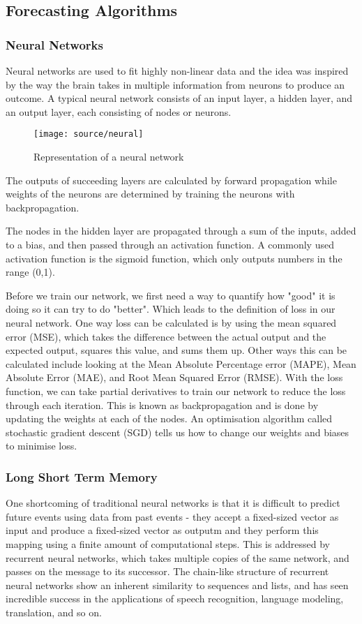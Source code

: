 \documentclass[12pt,twocolumn]{article}
\begin{document}
		\subsection{Forecasting Algorithms}

			\subsubsection*{Neural Networks}
				\quad Neural networks are used to fit highly non-linear data and the idea was inspired by the way the brain takes in multiple information from neurons to produce an outcome. A typical neural network consists of an input layer, a hidden layer, and an output layer, each consisting of nodes or neurons. 

				\begin{figure}[!htbp]
					\centering
					\texttt{[image: source/neural]}
					\caption{Representation of a neural network}
				\end{figure}

				The outputs of succeeding layers are calculated by forward propagation while weights of the neurons are determined by training the neurons with backpropagation. 

				The nodes in the hidden layer are propagated through a sum of the inputs, added to a bias, and then passed through an activation function. A commonly used activation function is the sigmoid function, which only outputs numbers in the range (0,1). 

				\quad Before we train our network, we first need a way to quantify how "good" it is doing so it can try to do "better". Which leads to the definition of loss in our neural network. One way loss can be calculated is by using the mean squared error (MSE), which takes the difference between the actual output and the expected output, squares this value, and sums them up. Other ways this can be calculated include looking at the Mean Absolute Percentage error (MAPE), Mean Absolute Error (MAE), and Root Mean Squared Error (RMSE). With the loss function, we can take partial derivatives to train our network to reduce the loss through each iteration. This is known as backpropagation and is done by updating the weights at each of the nodes. An optimisation algorithm called stochastic gradient descent (SGD) tells us how to change our weights and biases to minimise loss.

			\subsubsection*{Long Short Term Memory}
				\quad One shortcoming of traditional neural networks is that it is difficult to predict future events using data from past events - they accept a fixed-sized vector as input and produce a fixed-sized vector as outputm and they perform this mapping using a finite amount of computational steps. This is addressed by recurrent neural networks, which takes multiple copies of the same network, and passes on the message to its successor. The chain-like structure of recurrent neural networks show an inherent similarity to sequences and lists, and has seen incredible success in the applications of speech recognition, language modeling, translation, and so on.
\end{document}
